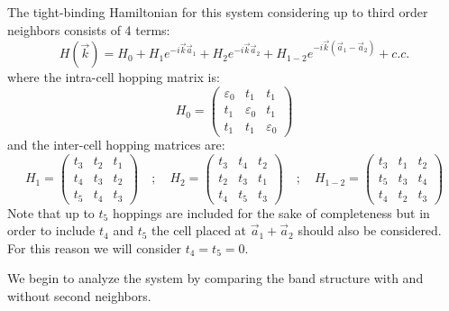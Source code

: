 \documentclass[a4paper]{article}
\begin{document}
The tight-binding Hamiltonian for this system considering up to third order neighbors consists of 4 terms:
\begin{equation}
  H(\vec{k}) = H_0 + H_1e^{-i\vec{k}\vec{a}_1} + H_2e^{-i\vec{k}\vec{a}_2} +
  H_{1-2}e^{-i\vec{k}(\vec{a}_1-\vec{a}_2)} + c.c.
\end{equation}
where the intra-cell hopping matrix is:
\begin{equation}
  H_0 = \left(\begin{array}{ccc}
  \varepsilon_0 & t_1 & t_1 \\
  t_1 & \varepsilon_0 & t_1 \\
  t_1 & t_1 & \varepsilon_0
  \end{array}\right)
\end{equation}
and the inter-cell hopping matrices are:
\begin{equation}
  H_1 = \left(\begin{array}{ccc}
    t_3 & t_2 & t_1 \\
    t_4 & t_3 & t_2 \\
    t_5 & t_4 & t_3
  \end{array}\right)\quad ; \quad
  H_2 = \left(\begin{array}{ccc}
    t_3 & t_4 & t_2 \\
    t_2 & t_3 & t_1 \\
    t_4 & t_5 & t_3
  \end{array}\right)\quad ; \quad
  H_{1-2} = \left(\begin{array}{ccc}
    t_3 & t_1 & t_2 \\
    t_5 & t_3 & t_4 \\
    t_4 & t_2 & t_3
  \end{array}\right)
\end{equation}
Note that up to $t_5$ hoppings are included for the sake of completeness but in order to include $t_4$ and $t_5$ the cell placed at $\vec{a}_1 + \vec{a}_2$ should also be considered. For this reason we will consider $t_4 = t_5 = 0$.

We begin to analyze the system by comparing the band structure with and without second neighbors.




% 

\end{document}
